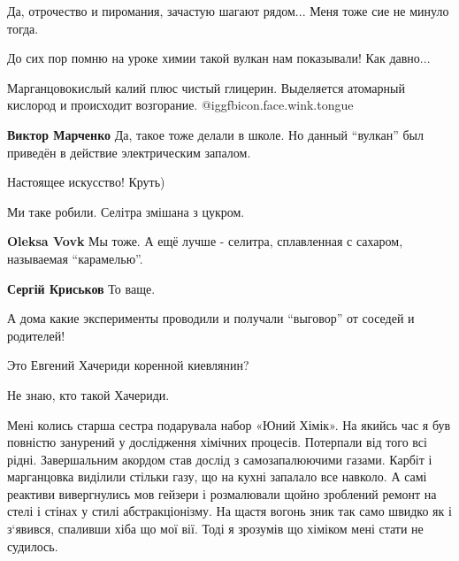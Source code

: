 \begin{itemize}
\begin{itemize}
Да, отрочество и пиромания, зачастую шагают рядом... Меня тоже сие не минуло тогда.
\end{itemize} %

До сих пор помню на уроке химии такой вулкан нам показывали! Как давно...


Марганцовокислый калий плюс чистый глицерин. Выделяется атомарный кислород и
происходит возгорание. @igg{fbicon.face.wink.tongue} 

\begin{itemize} %
\textbf{Виктор Марченко} Да, такое тоже делали в школе.
Но данный \enquote{вулкан} был приведён в действие электрическим запалом.
\end{itemize} %

Настоящее искусство! Круть)

Ми таке робили. Селітра змішана з цукром.

\begin{itemize} %
\textbf{Oleksa Vovk} Мы тоже. А ещё лучше - селитра, сплавленная с сахаром, называемая \enquote{карамелью}.

\textbf{Сергій Криськов} То ваще.
\end{itemize} %


А дома какие эксперименты проводили и получали \enquote{выговор} от соседей и
родителей!

Это Евгений Хачериди коренной киевлянин?


Не знаю, кто такой Хачериди.


Мені колись старша сестра подарувала набор «Юний Хімік». На якийсь час я був
повністю занурений у дослідження хімічних процесів. Потерпали від того всі
рідні. Завершальним акордом став дослід з самозапалюючими газами. Карбіт і
марганцовка виділили стільки газу, що на кухні запалало все навколо. А самі
реактиви вивергнулись мов гейзери і розмалювали щойно зроблений ремонт на стелі
і стінах у стилі абстракціонізму. На щастя вогонь зник так само швидко як і
з‘явився, спаливши хіба що мої вії. Тоді я зрозумів що хіміком мені стати не
судилось.

\end{itemize} %
